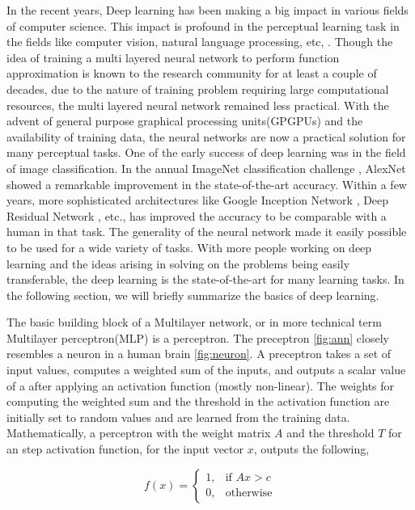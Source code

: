 \documentclass[conference]{IEEEtran}
\begin{document}
In the recent  years, Deep learning has been making a big impact in various fields of computer science. This impact is profound in the perceptual learning task in the fields like computer vision, natural language processing, etc, \cite{lecun2015deep}. Though the idea of training a multi layered neural network to perform function approximation is known to the research community for at least a couple of decades\cite{schmidhuber2015deep}, due to the nature of training problem requiring large computational resources, the multi layered neural network remained less practical. With the advent of general purpose graphical processing units(GPGPUs) and the availability of training data, the neural networks are now a practical solution for many perceptual tasks. One of the early success of deep learning was in the field of image classification. In the annual ImageNet classification challenge \cite{deng2009imagenet}, AlexNet \cite{krizhevsky2012imagenet} showed a remarkable improvement in the state-of-the-art accuracy. Within a few years, more sophisticated architectures like Google Inception Network \cite{szegedy2016rethinking}, Deep Residual Network \cite{he2016deep}, etc., has improved the accuracy to be comparable with a human in that task. The generality of the neural network made it easily possible to be used for a wide variety of tasks. With more people working on deep learning and the ideas arising in solving on the problems being easily transferable, the deep learning is the state-of-the-art for many learning tasks. In the following section, we will briefly summarize the basics of deep learning.


The basic building block of a Multilayer network, or in more technical term Multilayer  perceptron(MLP) is a perceptron. The preceptron \ref{fig:ann} closely resembles a neuron in a human brain \ref{fig:neuron}. A preceptron takes a set of input values, computes a weighted sum of the inputs, and outputs a scalar value of a after applying an activation function (mostly non-linear). The weights for computing the weighted sum and the threshold in the activation function are initially set to random values and are learned from the training data. 
Mathematically, a perceptron with the weight matrix $A$ and the threshold $T$ for an step activation function, for the input vector $x$, outputs the following,


\[
    f(x)= 
\begin{cases}
    1,& \text{if }  A x > c \\
    0,              & \text{otherwise}
\end{cases}
\]
\end{document}
